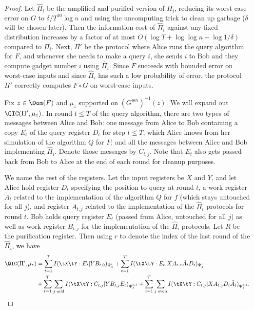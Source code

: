 \begin{proof}
Let $\hat{\Pi}_i$ be the amplified and purified version of $\Pi_i$,
reducing its worst-case error on $G$ to $\delta/T^{10}\log n$
and using the uncomputing trick to clean up garbage
($\delta$ will be chosen later).
Then the information cost of $\hat{\Pi}_i$
against any fixed distribution increases by a factor
of at most $O(\log T+\log\log n+\log1/\delta)$ compared to $\Pi_i$.
Next, $\Pi'$ be the protocol where Alice runs the query algorithm
for $F$, and whenever she needs to make a query $i$, she sends
$i$ to Bob and they compute gadget number $i$ using $\hat{\Pi}_i$.
Since $F$ succeeds with bounded error on worst-case inputs
and since $\hat{\Pi}_i$ has such a low probability of error,
the protocol $\Pi'$ correctly computes $F\circ G$ on
worst-case inputs.

Fix $z\in\Dom(F)$ and $\mu_z$ supported on $(G^{\oplus n})^{-1}(z)$.
We will expand out $\QIC(\Pi',\mu_z)$.
In round $t\le T$ of the query algorithm, there
are two types of messages between Alice and Bob: one
message from Alice to Bob containing a copy $E_t$ of the query
register $D_t$ for step $t\le T$, which Alice knows from her simulation
of the algorithm $Q$ for $F$; and
all the messages between Alice and Bob implementing $\hat{\Pi}_i$.
Denote those messages by $C_{t,j}$. Note that
$E_t$ also gets passed back from Bob to Alice at the end of each
round for cleanup purposes.

We name the rest of the registers.
Let the input registers be $X$ and $Y$, and let Alice hold
register $D_t$ specifying the position
to query at round $t$, a work register $\tilde{A}_t$
related to the implementation of the algorithm
$Q$ for $f$ (which stays untouched for all $j$),
and register $A_{t,j}$ related to the implementation
of the $\hat{\Pi}_i$ protocols
for round $t$. Bob holds query register $E_t$
(passed from Alice, untouched for all $j$)
as well as work register $B_{t,j}$
for the implementation of the $\hat{\Pi}_i$ protocols.
Let $R$ be the purification register. Then using $r$
to denote the index of the last round of the $\hat{\Pi}_i$, we have
\begin{align*}
\QIC(\Pi',\mu_z)&=\sum_{t=1}^T I(\tX\tY:E_t|YB_{t,0})_{\Psi^t_z}
+\sum_{t=1}^T I(\tX\tY:E_t|XA_{t,r}\tilde{A}_tD_t)_{\Psi^t_z}\\
&+\sum_{t=1}^T\sum_{j\text{ odd}} I(\tX\tY:C_{t,j}|YB_{t,j}E_t)_{\Psi^{t,j}_z}
+\sum_{t=1}^T\sum_{j\text{ even}} I(\tX\tY:C_{t,j}|XA_{t,j}D_t\tilde{A}_t)_{\Psi^{t,j}_z}.
\end{align*}


\end{proof}
